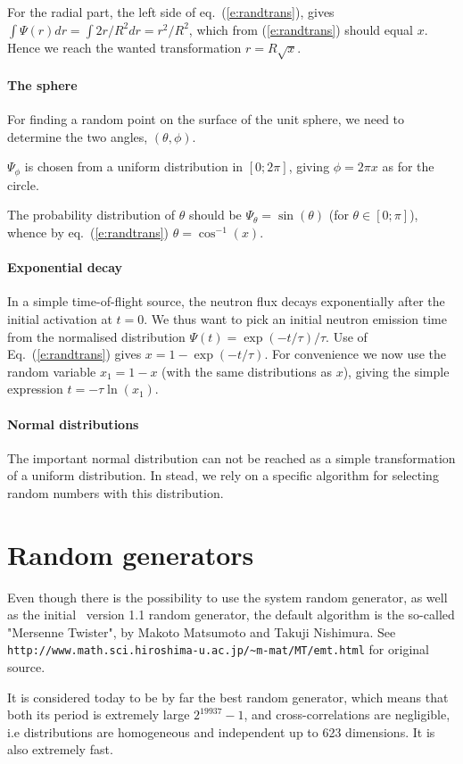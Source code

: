 For the radial part, the left side of eq.~(\ref{e:randtrans}), gives
$\int \Psi(r) dr = \int 2 r/R^2 dr = r^2/R^2$,
which from (\ref{e:randtrans}) should equal $x$.
Hence we reach the wanted transformation $r = R\sqrt{x}$.

\paragraph{The sphere}
For finding a random point on the surface of the unit sphere,
we need to determine the two angles, $(\theta, \phi)$.

$\Psi_\phi$ is chosen from a uniform distribution
in $[0; 2\pi]$, giving $\phi = 2\pi x$ as for the circle.

The probability distribution of $\theta$ should be
$\Psi_\theta=\sin(\theta)$ (for $\theta \in [0; \pi ]$),
whence by eq.~(\ref{e:randtrans}) $\theta=\cos^{-1}(x)$.

\paragraph{Exponential decay}
In a simple time-of-flight source, the neutron flux decays exponentially
after the initial activation at $t=0$. We thus want to pick an initial
neutron emission time from the normalised distribution
$\Psi(t) = \exp(-t/\tau) / \tau$.
Use of Eq.~(\ref{e:randtrans}) gives
$x = 1 - \exp(-t/\tau)$. For convenience we now use the random variable
$x_1 = 1-x$ (with the same distributions as $x$),
giving the simple expression $t = - \tau \ln (x_1)$.

\paragraph{Normal distributions}
The important normal distribution can not be reached as a simple
transformation of a uniform distribution.
In stead, we rely on a specific algorithm for selecting random
numbers with this distribution.

\section{Random generators}
 Even though there is
the possibility to use the system random generator, as well as the initial \MCS\
version 1.1 random generator, the default algorithm is the so-called "Mersenne
Twister", by Makoto Matsumoto and Takuji Nishimura. See \\
\verb+http://www.math.sci.hiroshima-u.ac.jp/~m-mat/MT/emt.html+ for original
source.

It is considered today to be by far the best random generator, which means that
both its period is extremely large $2^{19937}-1$, and cross-correlations are
negligible, i.e distributions are homogeneous and independent up to 623
dimensions. It is also extremely fast.

